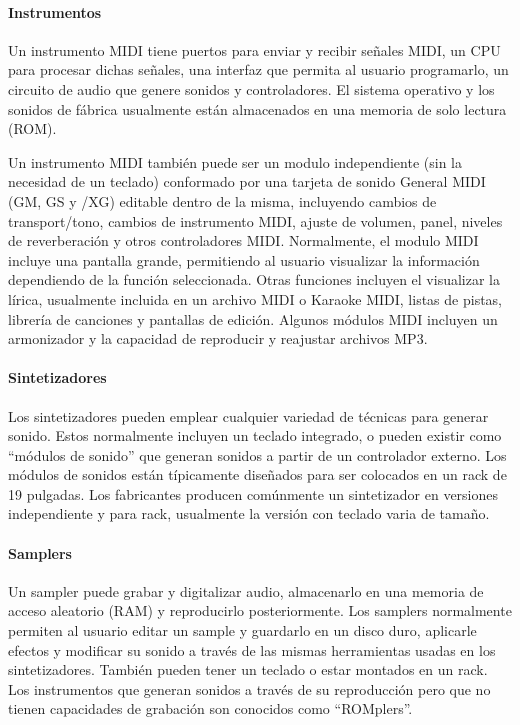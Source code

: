 \documentclass[a4paper,11pt,oneside]{book}
\begin{document}
\paragraph{Instrumentos}

Un instrumento MIDI tiene puertos para enviar y recibir señales MIDI, un CPU para procesar dichas señales, una interfaz que permita al usuario programarlo, un circuito de audio que genere sonidos y controladores. El sistema operativo y los sonidos de fábrica usualmente están almacenados en una memoria de solo lectura (ROM).

Un instrumento MIDI también puede ser un modulo independiente (sin la necesidad de un teclado) conformado por una tarjeta de sonido General MIDI (GM, GS y /XG) editable dentro de la misma, incluyendo cambios de transport/tono, cambios de instrumento MIDI, ajuste de volumen, panel, niveles de reverberación y otros controladores MIDI. Normalmente, el modulo MIDI incluye una pantalla grande, permitiendo al usuario visualizar la información dependiendo de la función seleccionada. Otras funciones incluyen el visualizar la lírica, usualmente incluida en un archivo MIDI o Karaoke MIDI, listas de pistas, librería de canciones y pantallas de edición. Algunos módulos MIDI incluyen un armonizador y la capacidad de reproducir y reajustar archivos MP3.


\paragraph{Sintetizadores}


Los sintetizadores pueden emplear cualquier variedad de técnicas para generar sonido. Estos normalmente incluyen un teclado integrado, o pueden existir como ``módulos de sonido'' que generan sonidos a partir de un controlador externo. Los módulos de sonidos están típicamente diseñados para ser colocados en un rack de 19 pulgadas. Los fabricantes producen comúnmente un sintetizador en versiones independiente y para rack, usualmente la versión con teclado varia de tamaño.


\paragraph{Samplers}


Un sampler puede grabar y digitalizar audio, almacenarlo en una memoria de acceso aleatorio (RAM) y reproducirlo posteriormente. Los samplers normalmente permiten al usuario editar un sample y guardarlo en un disco duro, aplicarle efectos y modificar su sonido a través de las mismas herramientas usadas en los sintetizadores. También pueden tener un teclado o estar montados en un rack. Los instrumentos que generan sonidos a través de su reproducción pero que no tienen capacidades de grabación son conocidos como ``ROMplers''.
\end{document}
